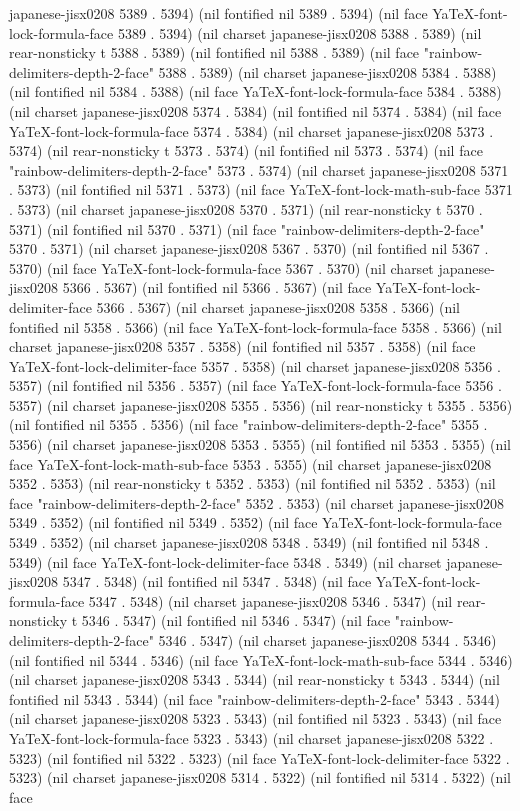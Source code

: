 japanese-jisx0208 5389 . 5394) (nil fontified nil 5389 . 5394) (nil face YaTeX-font-lock-formula-face 5389 . 5394) (nil charset japanese-jisx0208 5388 . 5389) (nil rear-nonsticky t 5388 . 5389) (nil fontified nil 5388 . 5389) (nil face "rainbow-delimiters-depth-2-face" 5388 . 5389) (nil charset japanese-jisx0208 5384 . 5388) (nil fontified nil 5384 . 5388) (nil face YaTeX-font-lock-formula-face 5384 . 5388) (nil charset japanese-jisx0208 5374 . 5384) (nil fontified nil 5374 . 5384) (nil face YaTeX-font-lock-formula-face 5374 . 5384) (nil charset japanese-jisx0208 5373 . 5374) (nil rear-nonsticky t 5373 . 5374) (nil fontified nil 5373 . 5374) (nil face "rainbow-delimiters-depth-2-face" 5373 . 5374) (nil charset japanese-jisx0208 5371 . 5373) (nil fontified nil 5371 . 5373) (nil face YaTeX-font-lock-math-sub-face 5371 . 5373) (nil charset japanese-jisx0208 5370 . 5371) (nil rear-nonsticky t 5370 . 5371) (nil fontified nil 5370 . 5371) (nil face "rainbow-delimiters-depth-2-face" 5370 . 5371) (nil charset japanese-jisx0208 5367 . 5370) (nil fontified nil 5367 . 5370) (nil face YaTeX-font-lock-formula-face 5367 . 5370) (nil charset japanese-jisx0208 5366 . 5367) (nil fontified nil 5366 . 5367) (nil face YaTeX-font-lock-delimiter-face 5366 . 5367) (nil charset japanese-jisx0208 5358 . 5366) (nil fontified nil 5358 . 5366) (nil face YaTeX-font-lock-formula-face 5358 . 5366) (nil charset japanese-jisx0208 5357 . 5358) (nil fontified nil 5357 . 5358) (nil face YaTeX-font-lock-delimiter-face 5357 . 5358) (nil charset japanese-jisx0208 5356 . 5357) (nil fontified nil 5356 . 5357) (nil face YaTeX-font-lock-formula-face 5356 . 5357) (nil charset japanese-jisx0208 5355 . 5356) (nil rear-nonsticky t 5355 . 5356) (nil fontified nil 5355 . 5356) (nil face "rainbow-delimiters-depth-2-face" 5355 . 5356) (nil charset japanese-jisx0208 5353 . 5355) (nil fontified nil 5353 . 5355) (nil face YaTeX-font-lock-math-sub-face 5353 . 5355) (nil charset japanese-jisx0208 5352 . 5353) (nil rear-nonsticky t 5352 . 5353) (nil fontified nil 5352 . 5353) (nil face "rainbow-delimiters-depth-2-face" 5352 . 5353) (nil charset japanese-jisx0208 5349 . 5352) (nil fontified nil 5349 . 5352) (nil face YaTeX-font-lock-formula-face 5349 . 5352) (nil charset japanese-jisx0208 5348 . 5349) (nil fontified nil 5348 . 5349) (nil face YaTeX-font-lock-delimiter-face 5348 . 5349) (nil charset japanese-jisx0208 5347 . 5348) (nil fontified nil 5347 . 5348) (nil face YaTeX-font-lock-formula-face 5347 . 5348) (nil charset japanese-jisx0208 5346 . 5347) (nil rear-nonsticky t 5346 . 5347) (nil fontified nil 5346 . 5347) (nil face "rainbow-delimiters-depth-2-face" 5346 . 5347) (nil charset japanese-jisx0208 5344 . 5346) (nil fontified nil 5344 . 5346) (nil face YaTeX-font-lock-math-sub-face 5344 . 5346) (nil charset japanese-jisx0208 5343 . 5344) (nil rear-nonsticky t 5343 . 5344) (nil fontified nil 5343 . 5344) (nil face "rainbow-delimiters-depth-2-face" 5343 . 5344) (nil charset japanese-jisx0208 5323 . 5343) (nil fontified nil 5323 . 5343) (nil face YaTeX-font-lock-formula-face 5323 . 5343) (nil charset japanese-jisx0208 5322 . 5323) (nil fontified nil 5322 . 5323) (nil face YaTeX-font-lock-delimiter-face 5322 . 5323) (nil charset japanese-jisx0208 5314 . 5322) (nil fontified nil 5314 . 5322) (nil face 